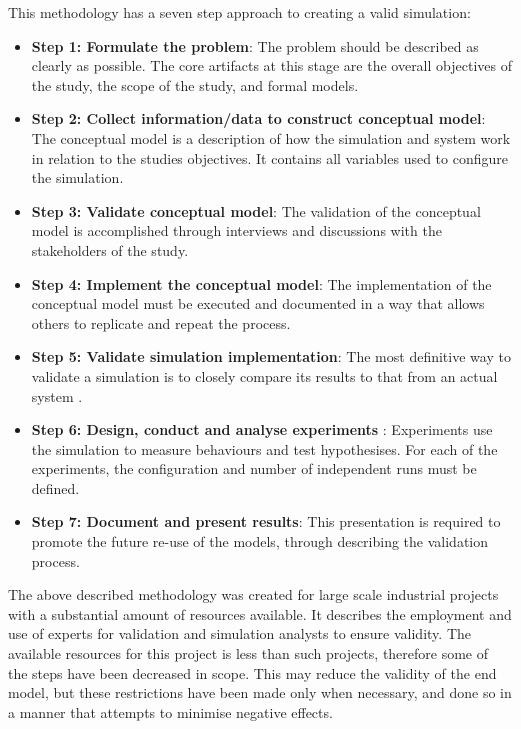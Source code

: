 This methodology has a seven step approach to creating a valid simulation:
\begin{itemize}
  \item \textbf{Step 1: Formulate the problem}: %
	The problem should be described as clearly as possible.
	The core artifacts at this stage are the overall objectives of the study, the scope of the study, and formal models.
\item \textbf{Step 2: Collect information/data to construct conceptual model}: %
	The conceptual model is a description of how the simulation and system work in relation to the studies objectives.
	It contains all variables used to configure the simulation. 
\item \textbf{Step 3: Validate conceptual model}: %
	The validation of the conceptual model is accomplished through interviews and discussions with the stakeholders of the study.
\item \textbf {Step 4: Implement the conceptual model}: %
	The implementation of the conceptual model must be executed and documented in a way that allows others to replicate and repeat the process.
\item \textbf{Step 5: Validate simulation implementation}: %
	The most definitive way to validate a simulation is to closely compare its results to that from an actual system \citep{Law2005}.
\item \textbf{Step 6: Design, conduct and analyse experiments} :
	Experiments use the simulation to measure behaviours and test hypothesises. 
	For each of the experiments, the configuration and number of independent runs must be defined.
\item \textbf{Step 7: Document and present results}:
	This presentation is required to promote the future re-use of the models, through describing the validation process.
\end{itemize}

The above described methodology was created for large scale industrial projects with a substantial amount of resources available.
It describes the employment and use of experts for validation and simulation analysts to ensure validity.
The available resources for this project is less than such projects, therefore some of the steps have been decreased in scope.
This may reduce the validity of the end model, but these restrictions have been made only when necessary,
and done so in a manner that attempts to minimise negative effects.

